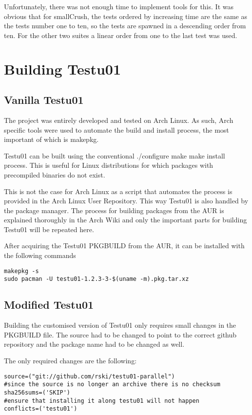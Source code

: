 Unfortunately, there was not enough time to implement tools for this. It was obvious that for smallCrush, the tests ordered by increasing time are the same as the tests number one to ten, so the tests are spawned in a descending order from ten. For the other two suites a linear order from one to the last test was used.

\section{Building Testu01}
\subsection{Vanilla Testu01}
The project was entirely developed and tested on Arch Linux. As such, Arch specific tools were used to automate the build and install process, the most important of which is makepkg.

Testu01 can be built using the conventional ./configure make make install process. This is useful for Linux distributions for which packages with precompiled binaries do not exist. 

This is not the case for Arch Linux as a script that automates the process is provided in the Arch Linux User Repository. This way Testu01 is also handled by the package manager. The process for building packages from the AUR is explained thoroughly in the Arch Wiki\cite{archwiki-aur} and only the important parts for building Testu01 will be repeated here.

After acquiring the Testu01 PKGBUILD from the AUR\cite{testu01-aur}, it can be installed with the following commands
\begin{verbatim}
makepkg -s
sudo pacman -U testu01-1.2.3-3-$(uname -m).pkg.tar.xz
\end{verbatim}

\subsection{Modified Testu01}
Building the customised version of Testu01 only requires small changes in the PKGBUILD file. The source had to be changed to point to the correct github repository and the package name had to be changed as well.

The only required changes are the following:
\begin{verbatim}
source=("git://github.com/rski/testu01-parallel")
#since the source is no longer an archive there is no checksum
sha256sums=('SKIP')
#ensure that installing it along testu01 will not happen
conflicts=('testu01')
\end{verbatim}

